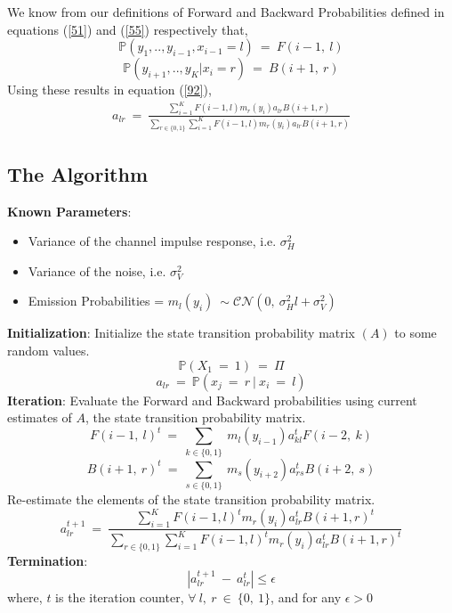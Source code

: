 \documentclass[12pt, draftcls, onecolumn]{IEEEtran}
\begin{document}
We know from our definitions of Forward and Backward Probabilities defined in equations (\ref{51}) and (\ref{55}) respectively that,
\[\mathbb{P}(y_1,..,y_{i-1},x_{i-1}=l)\ =\ F(i-1,\ l)\]
\[\mathbb{P}(y_{i+1},..,y_K|x_i=r)\ =\ B(i+1,\ r)\]
Using these results in equation (\ref{92}),
\begin{equation}\label{93}
    \begin{aligned}
        a_{lr}\ =\ \frac{\sum_{i=1}^{K}F(i-1,l)m_r(y_i)a_{lr}B(i+1,r)}{\sum_{r\in\{0,1\}}\sum_{i=1}^{K}F(i-1,l)m_r(y_i)a_{lr}B(i+1,r)}
    \end{aligned}
\end{equation}
\subsection{The Algorithm}
\textbf{Known Parameters}: 
\begin{itemize}
    \item Variance of the channel impulse response, i.e. $\sigma_H^2$
    \item Variance of the noise, i.e. $\sigma_V^2$
    \item Emission Probabilities = $m_l(y_i)\ \sim \mathcal{CN}(0,\ \sigma_H^2 l + \sigma_V^2)$
\end{itemize}
\textbf{Initialization}: Initialize the state transition probability matrix $(A)$ to some random values.
\[\mathbb{P}(X_1\ =\ 1)\ =\ \Pi\]
\[a_{lr}\ =\ \mathbb{P}(x_j\ =\ r\ |\ x_i\ =\ l)\]
\textbf{Iteration}: Evaluate the Forward and Backward probabilities using current estimates of $A$, the state transition probability matrix.
\[F(i-1,\ l)^{t}\ = \ \sum_{k\in\{0,1\}}\ m_l(y_{i-1})a_{kl}^tF(i-2,\ k)\]
\[B(i+1,\ r)^{t}\ =\ \sum_{s\in\{0,1\}}\ m_s(y_{i+2})a_{rs}^tB(i+2,\ s)\]
Re-estimate the elements of the state transition probability matrix.
\[a_{lr}^{t+1}\ =\ \frac{\sum_{i=1}^{K}F(i-1,l)^{t}m_r(y_i)a_{lr}^{t}B(i+1,r)^{t}}{\sum_{r\in\{0,1\}}\sum_{i=1}^{K}F(i-1,l)^{t}m_r(y_i)a_{lr}^{t}B(i+1,r)^{t}}\]
\textbf{Termination}: 
\[|a_{lr}^{t+1}\ -\ a_{lr}^t| \leq \epsilon\]
where,
$t$ is the iteration counter, $\forall\ l,\ r\ \in\ \{0,\ 1\}$, and for any $\epsilon > 0$
\end{document}
